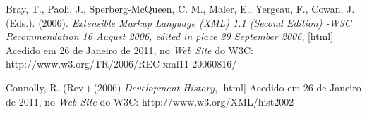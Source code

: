 \documentclass[a4,11pt]{article}
\begin{document}
\pagebreak

\begin{thebibliography}{9}
Bray, T., Paoli, J., Sperberg-McQueen, C. M., Maler, E., Yergeau, F., Cowan, J. (Eds.). (2006).
 \emph{Extensible Markup Language (XML) 1.1 (Second Edition) -W3C Recommendation 16 August 2006, edited in place 29 September 2006}, [html] Acedido em 26 de Janeiro de 2011, no \emph{Web Site} do W3C: http://www.w3.org/TR/2006/REC-xml11-20060816/

Connolly, R. (Rev.) (2006)
 \emph{Development History}, [html] Acedido em 26 de Janeiro de 2011, no \emph{Web Site} do W3C: http://www.w3.org/XML/hist2002

\end{thebibliography}

\printindex
\end{document}
